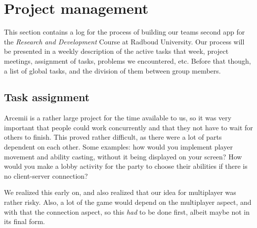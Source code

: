 \documentclass[../main.tex]{subfiles}
\begin{document}
\pagebreak
\section{Project management}
This section contains a log for the process of building our teams second app for the \textit{Research and Development} Course at Radboud University.
Our process will be presented in a weekly description of the active tasks that week, project meetings, assignment of tasks, problems we encountered, etc. Before that though, a list of global tasks, and the division of them between group members.

\subsection{Task assignment}
Arcemii is a rather large project for the time available to us, so it was very important that people could work concurrently and that they not have to wait for others to finish. This proved rather difficult, as there were a lot of parts dependent on each other. Some examples: how would you implement player movement and ability casting, without it being displayed on your screen? How would you make a lobby activity for the party to choose their abilities if there is no client-server connection?

We realized this early on, and also realized that our idea for multiplayer was rather risky. Also, a lot of the game would depend on the multiplayer aspect, and with that the connection aspect, so this \textit{had} to be done first, albeit maybe not in its final form.
\end{document}
